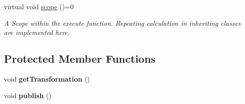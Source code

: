 \begin{DoxyCompactItemize}
\item 
virtual void \hyperlink{classController_af89e3d7ed87318418f0168727bd98f0f}{scope} ()=0\hypertarget{classController_af89e3d7ed87318418f0168727bd98f0f}{}\label{classController_af89e3d7ed87318418f0168727bd98f0f}

\begin{DoxyCompactList}\small\item\em A Scope within the execute function. Repeating calculation in inheriting classes are implemented here. \end{DoxyCompactList}\end{DoxyCompactItemize}
\subsection*{Protected Member Functions}
\begin{DoxyCompactItemize}
\item 
void {\bfseries get\+Transformation} ()\hypertarget{classController_a5f86e07f526598b251e345a908923950}{}\label{classController_a5f86e07f526598b251e345a908923950}

\item 
void {\bfseries publish} ()\hypertarget{classController_ae6859e3a43be2fa31cb82ace3954e746}{}\label{classController_ae6859e3a43be2fa31cb82ace3954e746}

\end{DoxyCompactItemize}

